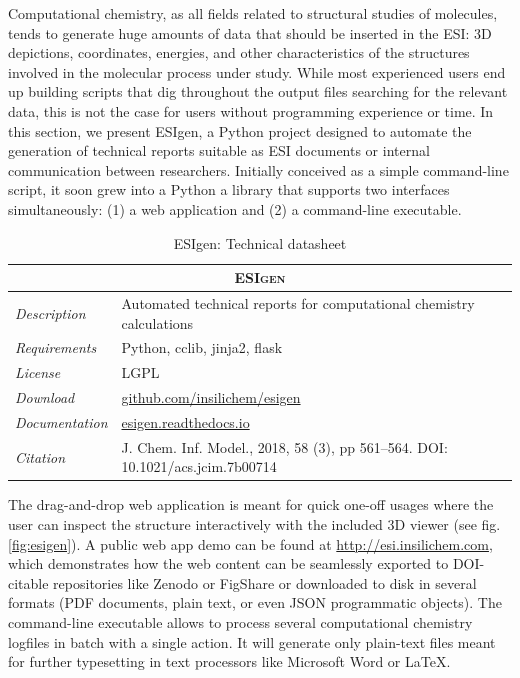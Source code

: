 Computational chemistry, as all fields related to structural studies of molecules, tends to generate huge amounts of data that should be inserted in the ESI: 3D depictions, coordinates, energies, and other characteristics of the structures involved in the molecular process under study. While most experienced users end up building scripts that dig throughout the output files searching for the relevant data, this is not the case for users without programming experience or time. In this section, we present ESIgen,\cite{esigen} a Python project designed to automate the generation of technical reports suitable as ESI documents or internal communication between researchers. Initially conceived as a simple command-line script, it soon grew into a Python a library that supports two interfaces simultaneously: (1) a web application and (2) a command-line executable.


\begin{table}[hbtp]
	\caption{ESIgen: Technical datasheet}
	\footnotesize
	\newcommand{\tableheading}[1]{\multicolumn{2}{c}{\textsc{#1}}}
	\begin{tabularx}{\textwidth}{RL}
		\toprule
		\tableheading{ESIgen}\\
		\toprule
		\textit{Description} & Automated technical reports for computational chemistry calculations \\
		\midrule
		\textit{Requirements} & Python, cclib, jinja2, flask \\
		\midrule
		\textit{License} & LGPL \\
		\midrule
		\textit{Download} & \href{https://github.com/insilichem/esigen}{github.com/insilichem/esigen} \\
		\midrule
		\textit{Documentation} & \href{http://esigen.readthedocs.io}{esigen.readthedocs.io} \\
		\midrule
		\textit{Citation} & J. Chem. Inf. Model., 2018, 58 (3), pp 561–564. DOI: 10.1021/acs.jcim.7b00714\cite{esigen} \\
		\bottomrule

	\end{tabularx}
\end{table}

The drag-and-drop web application is meant for quick one-off usages where the user can inspect the structure interactively with the included 3D viewer (see fig. \ref{fig:esigen}). A public web app demo can be found at \href{esi.insilichem.com}{http://esi.insilichem.com}, which demonstrates how the web content can be seamlessly exported to DOI-citable repositories like Zenodo or FigShare or downloaded to disk in several formats (PDF documents, plain text, or even JSON programmatic objects). The command-line executable allows to process several computational chemistry logfiles in batch with a single action. It will generate only plain-text files meant for further typesetting in text processors like Microsoft Word or LaTeX.



